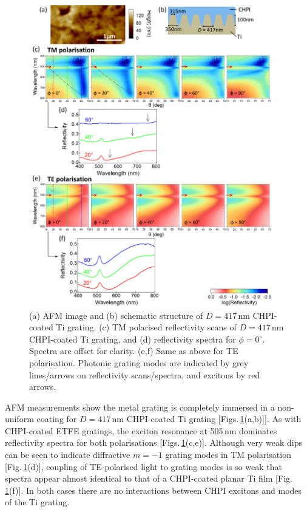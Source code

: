 \begin{figure}[h!] 
\centering    
\includegraphics[width=0.95\textwidth]{Fig6}
\caption[(a) AFM image and (b) schematic structure of $D=417$\,nm CHPI-coated Ti grating. Reflectivity measurements of CHPI-coated Ti grating in (c,d) TM and (e.f) TE polarisation.]{(a) AFM image and (b) schematic structure of $D=417$\,nm CHPI-coated Ti grating. (c) TM polarised reflectivity scans of $D=417$\,nm CHPI-coated Ti grating, and (d) reflectivity spectra for $\phi=0^{\circ}$. Spectra are offset for clarity. (e,f) Same as above for TE polarisation. Photonic grating modes are indicated by grey lines/arrows on reflectivity scans/spectra, and excitons by red arrows.}
\label{7Fig6}
\end{figure}
AFM measurements show the metal grating is completely immersed in a non-uniform coating for $D=417$\,nm CHPI-coated Ti grating [Figs.\,\ref{7Fig6}(a,b)]]. As with CHPI-coated ETFE gratings, the exciton resonance at 505\,nm dominates reflectivity spectra for both polarisations [Figs.\,\ref{7Fig6}(c,e)]. Although very weak dips can be seen to indicate diffractive $m=-1$ grating modes in TM polarisation [Fig.\,\ref{7Fig6}(d)], coupling of TE-polarised light to grating modes is so weak that spectra appear almost identical to that of a CHPI-coated planar Ti film [Fig.\,\ref{7Fig6}(f)]. In both cases there are no interactions between CHPI excitons and modes of the Ti grating.

